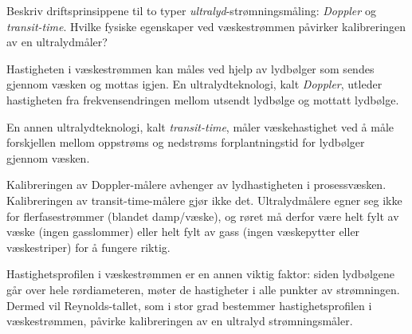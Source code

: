 

Beskriv driftsprinsippene til to typer \textit{ultralyd}-strømningsmåling: \textit{Doppler} og \textit{transit-time}. Hvilke fysiske egenskaper ved væskestrømmen påvirker kalibreringen av en ultralydmåler?







Hastigheten i væskestrømmen kan måles ved hjelp av lydbølger som sendes gjennom væsken og mottas igjen. En ultralydteknologi, kalt \textit{Doppler}, utleder hastigheten fra frekvensendringen mellom utsendt lydbølge og mottatt lydbølge.

En annen ultralydteknologi, kalt \textit{transit-time}, måler væskehastighet ved å måle forskjellen mellom oppstrøms og nedstrøms forplantningstid for lydbølger gjennom væsken.

Kalibreringen av Doppler-målere avhenger av lydhastigheten i prosessvæsken. Kalibreringen av transit-time-målere gjør ikke det. Ultralydmålere egner seg ikke for flerfasestrømmer (blandet damp/væske), og røret må derfor være helt fylt av væske (ingen gasslommer) eller helt fylt av gass (ingen væskepytter eller væskestriper) for å fungere riktig.







Hastighetsprofilen i væskestrømmen er en annen viktig faktor: siden lydbølgene går over hele rørdiameteren, møter de hastigheter i alle punkter av strømningen. Dermed vil Reynolds-tallet, som i stor grad bestemmer hastighetsprofilen i væskestrømmen, påvirke kalibreringen av en ultralyd strømningsmåler.



